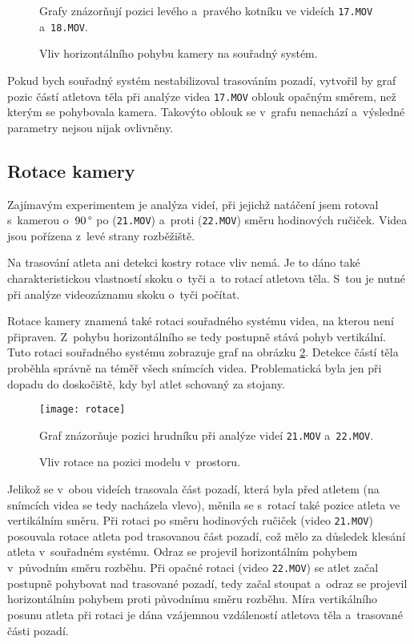 \begin{figure}[h]\centering
    \caption{Vliv horizontálního pohybu kamery na souřadný systém.}
    \small
    Grafy znázorňují pozici levého a~pravého kotníku ve videích \texttt{17.MOV} a~\texttt{18.MOV}.
    \label{fig:vpohyb}
\end{figure}

Pokud bych souřadný systém nestabilizoval trasováním pozadí, vytvořil by graf pozic částí atletova těla při analýze videa \texttt{17.MOV} oblouk opačným směrem, než kterým se pohybovala kamera. Takovýto oblouk se v~grafu nenachází a~výsledné parametry nejsou nijak ovlivněny.



\subsection{Rotace kamery}

Zajímavým experimentem je analýza videí, při jejichž natáčení jsem rotoval s~kamerou o~$90\,\rm \degree$ po (\texttt{21.MOV}) a~proti (\texttt{22.MOV}) směru hodinových ručiček. Videa jsou pořízena z~levé strany rozběžiště.

Na trasování atleta ani detekci kostry rotace vliv nemá. Je to dáno také charakteristickou vlastností skoku o~tyči a~to rotací atletova těla. S~tou je nutné při analýze videozáznamu skoku o~tyči počítat.

Rotace kamery znamená také rotaci souřadného systému videa, na kterou není připraven. Z~pohybu horizontálního se tedy postupně stává pohyb vertikální. Tuto rotaci souřadného systému zobrazuje graf na obrázku \ref{fig:rotace}. Detekce částí těla proběhla správně na téměř všech snímcích videa. Problematická byla jen při dopadu do doskočiště, kdy byl atlet schovaný za stojany.

\begin{figure}[h]\centering
    \texttt{[image: rotace]}
    \caption{Vliv rotace na pozici modelu v~prostoru.}
    \small
    Graf znázorňuje pozici hrudníku při analýze videí \texttt{21.MOV} a~\texttt{22.MOV}.
    \label{fig:rotace}
\end{figure}

Jelikož se v~obou videích trasovala část pozadí, která byla před atletem (na snímcích videa se tedy nacházela vlevo), měnila se s~rotací také pozice atleta ve vertikálním směru. Při rotaci po směru hodinových ručiček (video \texttt{21.MOV}) posouvala rotace atleta pod trasovanou část pozadí, což mělo za důsledek klesání atleta v~souřadném systému. Odraz se projevil horizontálním pohybem v~původním směru rozběhu. Při opačné rotaci (video \texttt{22.MOV}) se atlet začal postupně pohybovat nad trasované pozadí, tedy začal stoupat a~odraz se projevil horizontálním pohybem proti původnímu směru rozběhu. Míra vertikálního posunu atleta při rotaci je dána vzájemnou vzdáleností atletova těla a~trasované části pozadí.

